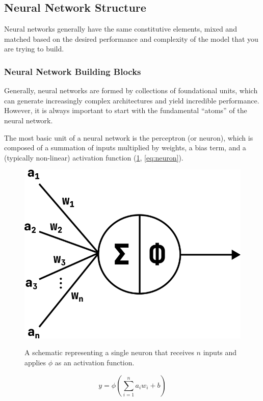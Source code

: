 \subsection{Neural Network Structure}
Neural networks generally have the same constitutive elements, mixed and matched based on the desired performance and complexity of the model that you are trying to build.

\subsubsection{Neural Network Building Blocks}
Generally, neural networks are formed by collections of foundational units, which can generate increasingly complex architectures and yield incredible performance. However, it is always important to start with the fundamental ``atoms'' of the neural network.

The most basic unit of a neural network is the perceptron (or neuron), which is composed of a summation of inputs multiplied by weights, a bias term, and a (typically non-linear) activation function (\cref{fig:neuron}, \cref{eq:neuron}).
\begin{figure}[h!]
    \begin{center}
        {\includegraphics[width=0.55\linewidth]{figs/background/png/neuron.png}}
    \end{center}
    \caption{A schematic representing a single neuron that receives $n$ inputs and applies $\phi$ as an activation function.}
    \label{fig:neuron}
\end{figure}

\begin{equation}
    y = \phi(\sum_{i=1}^{n}a_i w_i + b)
    \label{eq:neuron}
\end{equation}

